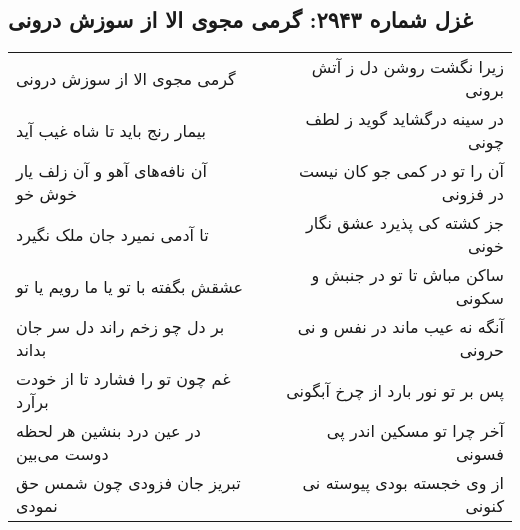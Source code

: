 \begin{center}
\section*{غزل شماره ۲۹۴۳: گرمی مجوی الا از سوزش درونی}
\label{sec:2943}
\begin{longtable}{l p{0.5cm} r}
گرمی مجوی الا از سوزش درونی
&&
زیرا نگشت روشن دل ز آتش برونی
\\
بیمار رنج باید تا شاه غیب آید
&&
در سینه درگشاید گوید ز لطف چونی
\\
آن نافه‌های آهو و آن زلف یار خوش خو
&&
آن را تو در کمی جو کان نیست در فزونی
\\
تا آدمی نمیرد جان ملک نگیرد
&&
جز کشته کی پذیرد عشق نگار خونی
\\
عشقش بگفته با تو یا ما رویم یا تو
&&
ساکن مباش تا تو در جنبش و سکونی
\\
بر دل چو زخم راند دل سر جان بداند
&&
آنگه نه عیب ماند در نفس و نی حرونی
\\
غم چون تو را فشارد تا از خودت برآرد
&&
پس بر تو نور بارد از چرخ آبگونی
\\
در عین درد بنشین هر لحظه دوست می‌بین
&&
آخر چرا تو مسکین اندر پی فسونی
\\
تبریز جان فزودی چون شمس حق نمودی
&&
از وی خجسته بودی پیوسته نی کنونی
\\
\end{longtable}
\end{center}
